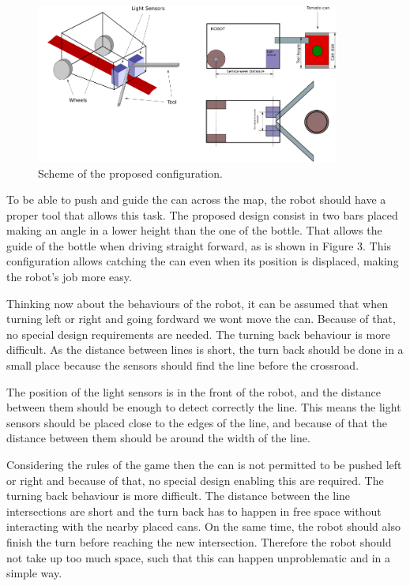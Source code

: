 \documentclass[12pt,a4paper]{article}
\begin{document}
\begin{figure}[H]
\includegraphics[width=10cm]{Fig2.png}
\centering
\caption{Scheme of the proposed configuration.}
\label{fig:robotscheme}
\end{figure}

To be able to push and guide the can across the map, the robot should have a proper tool that allows this task. 
The proposed design consist in two bars placed making an angle in a lower height than the one of the bottle. That allows the guide of the bottle when driving straight forward, as is shown in Figure 3. This configuration allows catching the can even when its position is displaced, making the robot's job more easy.

Thinking now about the behaviours of the robot, it can be assumed that when turning left or right and going fordward we wont move the can. Because of that, no special design requirements are needed. The turning back behaviour is more difficult. As the distance between lines is short, the turn back should be done in a small place because the sensors should find the line before the crossroad.

The position of the light sensors is in the front of the robot, and the distance between them should be enough to detect correctly the line. This means the light sensors should be placed close to the edges of the line, and because of that the distance between them should be around the width of the line.

Considering the rules of the game then the can is not permitted to be pushed left or right and because of that, no special design enabling this are required. 
The turning back behaviour is more difficult. 
The distance between the line intersections are short and the turn back has to happen in free space without interacting with the nearby placed cans.
On the same time, the robot should also finish the turn before reaching the new intersection.
Therefore the robot should not take up too much space, such that this can happen unproblematic and in a simple way.
\end{document}

